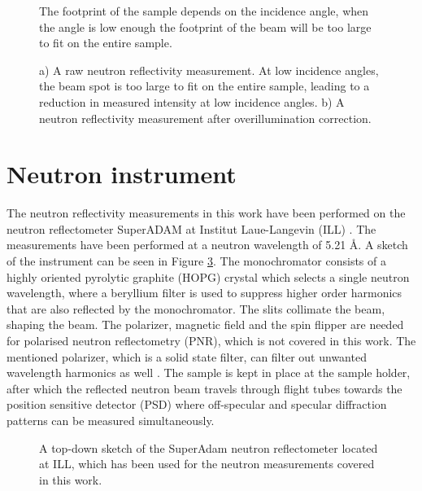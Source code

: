 \begin{figure}
	\centering
	\def\svgwidth{\textwidth}
	
	\caption{The footprint of the sample depends on the incidence angle, when the angle is low enough the footprint of the beam will be too large to fit on the entire sample.}
	\label{footprint_effect}
\end{figure}
\begin{figure}
	\centering
	\def\svgwidth{\textwidth}
	
	\caption{a) A raw neutron reflectivity measurement. At low incidence angles, the beam spot is too large to fit on the entire sample, leading to a reduction in measured intensity at low incidence angles. b) A neutron reflectivity measurement after overillumination correction.}
	\label{raw_measurement}
\end{figure}
\clearpage
\section{Neutron instrument}
The neutron reflectivity measurements in this work have been performed on the neutron reflectometer SuperADAM at Institut Laue-Langevin (ILL) \cite{superadam}.  The measurements have been performed at a neutron wavelength of 5.21 Å. A sketch of the instrument can be seen in Figure \ref{superadamsketch}. The monochromator consists of a highly oriented pyrolytic graphite (HOPG) crystal which selects a single neutron wavelength, where a beryllium filter is used to suppress higher order harmonics that are also reflected by the monochromator. The slits collimate the beam, shaping the beam. The polarizer, magnetic field and the spin flipper are needed for polarised neutron reflectometry (PNR), which is not covered in this work. The mentioned polarizer, which is a solid state filter, can filter out unwanted wavelength harmonics as well \cite{superadam}. The sample is kept in place at the sample holder, after which the reflected neutron beam travels through flight tubes towards the position sensitive detector (PSD) where off-specular and specular diffraction patterns can be measured simultaneously. 
\begin{figure}[b]
	\centering
	\def\svgwidth{\textwidth}
	
	\caption{A top-down sketch of the SuperAdam neutron reflectometer located at ILL, which has been used for the neutron measurements covered in this work.}
\label{superadamsketch}
\end{figure}

